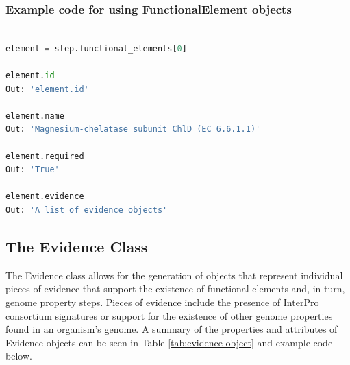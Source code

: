 \subsubsection{Example code for using FunctionalElement objects}

\begin{lstlisting}[language=Python]

element = step.functional_elements[0]
	
element.id
Out: 'element.id'

element.name
Out: 'Magnesium-chelatase subunit ChlD (EC 6.6.1.1)'

element.required
Out: 'True'

element.evidence
Out: 'A list of evidence objects'

\end{lstlisting}

\subsection{The Evidence Class}

The Evidence class allows for the generation of objects that represent individual pieces of evidence that support the existence of functional elements and, in turn, genome property steps. Pieces of evidence include the presence of InterPro consortium signatures \cite{hunter2008interpro} or support for the existence of other genome properties found in an organism's genome. A summary of the properties and attributes of Evidence objects can be seen in Table \ref{tab:evidence-object} and example code below.

